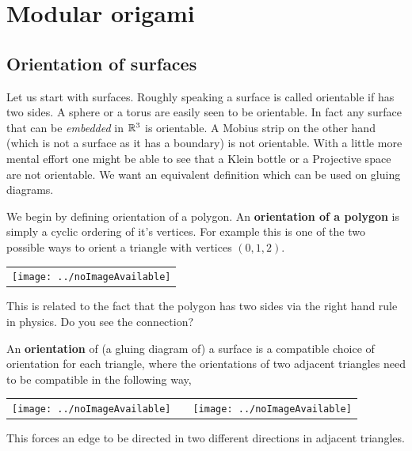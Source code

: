 \section{Modular origami}

\subsection{Orientation of surfaces}
Let us start with surfaces. Roughly speaking a surface is called orientable if has two sides. A sphere or a torus are easily seen to be orientable. In fact any surface that can be \textit{embedded} in $\mathbb{R}^3$ is orientable. A Mobius strip on the other hand (which is not a surface as it has a boundary) is not orientable. With a little more mental effort one might be able to see that a Klein bottle or a Projective space are not orientable. We want an equivalent definition which can be used on gluing diagrams.

We begin by defining orientation of a polygon. An \textbf{orientation of a polygon} is simply a cyclic ordering of it's vertices. For example this is one of the two possible ways to orient a triangle with vertices $(0,1,2)$.

\begin{center}
	\begin{tabular}{c}
		\centering \texttt{[image: ../noImageAvailable]}
	\end{tabular}
\end{center}

\begin{exercise}
	This is related to the fact that the polygon has two sides via the right hand rule in physics. Do you see the connection?
\end{exercise}

An \textbf{orientation} of (a gluing diagram of) a surface is a compatible choice of orientation for each triangle, where the orientations of two adjacent triangles need to be compatible in the following way,
\begin{center}
	\begin{tabular}{c c c}
		\centering \texttt{[image: ../noImageAvailable]} & \: & \centering \texttt{[image: ../noImageAvailable]}
	\end{tabular}
\end{center}
This forces an edge to be directed in two different directions in adjacent triangles.


